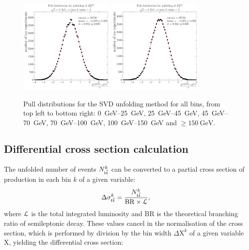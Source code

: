 \begin{figure}[hbtp]
    \includegraphics[width=0.42\textwidth]{unfolding_performance/pull_from_files_bin_4_stats_89700}
    \includegraphics[width=0.42\textwidth]{unfolding_performance/pull_from_files_bin_5_stats_89700}
    \caption[Pull distributions for the SVD unfolding]{Pull distributions for the SVD unfolding method for all \MET bins,
    from top left to bottom right: \SIrange{0}{25}{\GeV}, \SIrange{25}{45}{\GeV}, \SIrange{45}{70}{\GeV},
    \SIrange{70}{100}{\GeV}, \SIrange{100}{150}{\GeV} and $\geq \SI{150}{\GeV}$.}
    \label{fig:met_SVD_pull}
\end{figure}

\subsection{Differential cross section calculation}
\label{ss_xsection:calculation}

The unfolded number of \ttbar events $N_{\mathrm{t}\overline{\mathrm{t}}}^k$ can be converted to a partial cross section of \ttbar production in
each bin $k$ of a given variable:
\begin{equation}
\label{eq:partial_xsection}
\Delta\sigma_{\mathrm{t}\overline{\mathrm{t}}}^k = \frac{N_{\mathrm{t}\overline{\mathrm{t}}}^k}{\mathrm{BR} \times {\cal L}},
\end{equation}
where $\cal L$ is the total integrated luminosity and $\mathrm{BR}$ is the theoretical branching ratio of semileptonic
\ttbar decay. These values cancel in the normalisation of the cross section, which is performed by division by the bin
width $\Delta \mathrm{X}^k$ of a given variable $\mathrm{X}$, yielding the differential cross section:

